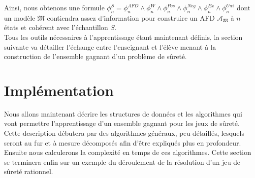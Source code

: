 \documentclass[12pt,a4paper,oneside,titlepage]{report}
\begin{document}
Ainsi, nous obtenons une formule $\phi^S_n=\phi_n^{AFD}\land\phi_n^{W}\land\phi_n^{Pos}\land\phi_n^{Neg}\land\phi_n^{Ex}\land\phi_n^{Uni}$ dont un modèle $\mathfrak{M}$ contiendra assez d'information pour construire un AFD $\mathcal{A}_\mathfrak{M}$ à $n$ états et cohérent avec l'échantillon $S$.\\

Tous les outils nécessaires à l'apprentissage étant maintenant définis, la section suivante va détailler l'échange entre l'enseignant et l'élève menant à la construction de l'ensemble gagnant d'un problème de sûreté.  
\newpage
\section{Implémentation}
Nous allons maintenant décrire les structures de données et les algorithmes qui vont permettre l'apprentissage d'un ensemble gagnant pour les jeux de sûreté. Cette description débutera par des algorithmes généraux, peu détaillés, lesquels seront au fur et à mesure décomposés afin d'être expliqués plus en profondeur.\\
Ensuite nous calculerons la complexité en temps de ces algorithmes. Cette section se terminera enfin sur un exemple du déroulement de la résolution d'un jeu de sûreté rationnel.
\end{document}
